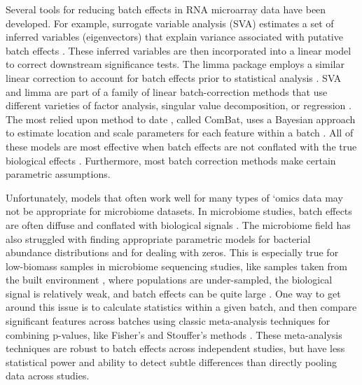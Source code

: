 Several tools for reducing batch effects in RNA microarray data have been developed.
For example, surrogate variable analysis (SVA) estimates a set of inferred variables (eigenvectors) that explain variance associated with putative batch effects \cite{4}.
These inferred variables are then incorporated into a linear model to correct downstream significance tests.
The limma package employs a similar linear correction to account for batch effects prior to statistical analysis \cite{5}.
SVA and limma are part of a family of linear batch-correction methods that use different varieties of factor analysis, singular value decomposition, or regression \cite{4,5,6,7}.
The most relied upon method to date \cite{8}, called ComBat, uses a Bayesian approach to estimate location and scale parameters for each feature within a batch \cite{9}.
All of these models are most effective when batch effects are not conflated with the true biological effects \cite{1}.
Furthermore, most batch correction methods make certain parametric assumptions.

Unfortunately, models that often work well for many types of `omics data may not be appropriate for microbiome datasets.
In microbiome studies, batch effects are often diffuse and conflated with biological signals \cite{10,11,12}.
The microbiome field has also struggled with finding appropriate parametric models for bacterial abundance distributions and for dealing with zeros.
This is especially true for low-biomass samples in microbiome sequencing studies, like samples taken from the built environment \cite{13}, where populations are under-sampled, the biological signal is relatively weak, and batch effects can be quite large \cite{14}.
One way to get around this issue is to calculate statistics within a given batch, and then compare significant features across batches using classic meta-analysis techniques for combining p-values, like Fisher's and Stouffer's methods \cite{15,16}.
These meta-analysis techniques are robust to batch effects across independent studies, but have less statistical power and ability to detect subtle differences than directly pooling data across studies.

